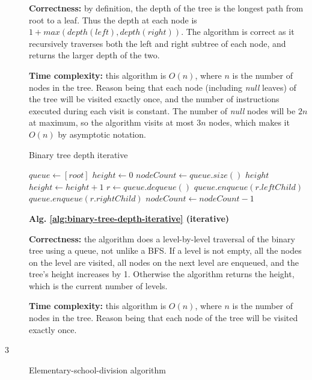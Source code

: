 \documentclass{article}
\begin{document}
\begin{description}
  \textbf{Correctness:} by definition, the depth of the tree is the longest path from root to a leaf. Thus the depth at each node is $1 + max(depth(left), depth(right))$. The algorithm is correct as it recursively traverses both the left and right subtree of each node, and returns the larger depth of the two.

  \textbf{Time complexity:} this algorithm is $O(n)$, where $n$ is the number of nodes in the tree. Reason being that each node (including \textit{null} leaves) of the tree will be visited exactly once, and the number of instructions executed during each visit is constant. The number of \textit{null} nodes will be $2n$ at maximum, so the algorithm visits at most $3n$ nodes, which makes it $O(n)$ by asymptotic notation.

  \begin{algorithm}[h]
  \caption{Binary tree depth iterative}
  \label{alg:binary-tree-depth-iterative}
    \begin{algorithmic}[1]
      \State $queue \gets [root]$
      \State $height \gets 0$
        \State $nodeCount \gets queue.size()$
          \State \Return $height$
        \EndIf
        \State $height \gets height + 1$
          \State $r \gets queue.dequeue()$
             \State $queue.enqueue(r.leftChild)$
          \EndIf
             \State $queue.enqueue(r.rightChild)$
          \EndIf
          \State $nodeCount \gets nodeCount - 1$
        \EndWhile
      \EndWhile
    \EndFunction
    \end{algorithmic}
  \end{algorithm}

  \textbf{Alg. \ref{alg:binary-tree-depth-iterative} (iterative)}

  \textbf{Correctness:} the algorithm does a level-by-level traversal of the binary tree using a queue, not unlike a BFS. If a level is not empty, all the nodes on the level are visited, all nodes on the next level are enqueued, and the tree's height increases by 1. Otherwise the algorithm returns the height, which is the current number of levels.

  \textbf{Time complexity:} this algorithm is $O(n)$, where $n$ is the number of nodes in the tree. Reason being that each node of the tree will be visited exactly once.

\item[3]{Elementary-school-division algorithm}


\end{description}
\end{document}

